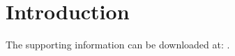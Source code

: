 \documentclass[sensors,article,accept,pdftex,moreauthors]{Definitions/mdpi}
\begin{document}
\section{Introduction}
The supporting information can be downloaded at: .
\end{document}
